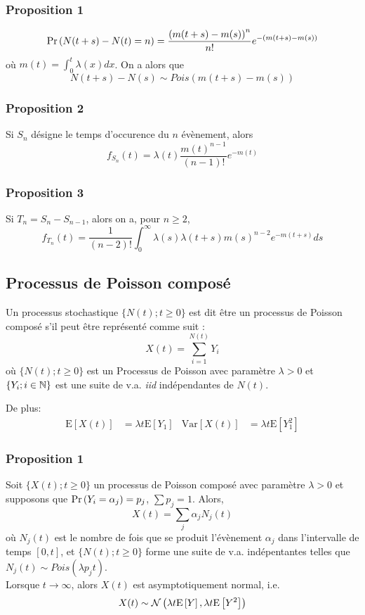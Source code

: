 \documentclass[10pt, french, landscape]{article}
\begin{document}
\begin{multicols*}{2}
\subsubsection*{Proposition 1}
\[\Pr \left( N(t+s) - N(t) = n \right)  = \frac{\left(m(t+s) - m(s) \right)^n}{n!} e^{-(m(t+s) - m(s))} \]
où $m(t) = \int_{0}^{t} \lambda(x) dx$. On a alors que
\[N(t+s) - N(s) \sim Pois(m(t+s) - m(s))\]


\subsubsection*{Proposition 2}
Si $S_n$ désigne le temps d'occurence du $n$ évènement, alors
\[f_{S_n}(t) = \lambda(t) \frac{m(t)^{n-1}}{(n-1)!} e^{-m(t)} \]

\subsubsection*{Proposition 3}
Si $T_n = S_{n} - S_{n-1}$, alors on a, pour $n \geq 2$,
\[f_{T_n}(t) = \frac{1}{(n-2)!} \int_{0}^{\infty} \lambda(s) \lambda(t+s) m(s)^{n-2} e^{-m(t+s)} ds \]

\subsection*{Processus de Poisson composé}
\begin{definition}[Définition]
Un processus stochastique $\{ N(t) ; t \geq 0  \}$ est dit être un processus de Poisson composé s'il peut être représenté comme suit : 
\[X(t) = \sum_{i=1}^{N(t)} Y_i\]
où $\{ N(t) ; t \geq 0  \}$ est un Processus de Poisson avec paramètre $\lambda > 0$ et $\{ Y_i ; i \in \mathbb{N} \}$ est une suite de v.a. \emph{iid} indépendantes de $N(t)$.

De plus:
\begin{align*}
	\text{E}[X(t)]	&=	\lambda t \text{E}[Y_1]	&
	\text{Var}[X(t)]	&=	\lambda t \text{E}[Y_1^{2}]
\end{align*}
\end{definition}

\subsubsection*{Proposition 1}
Soit $\{ X(t) ; t \geq 0 \}$ un processus de Poisson composé avec paramètre $\lambda > 0$ et supposons que $\Pr \left( Y_i = \alpha_j \right) = p_j$, $\sum p_j = 1$. Alors,
\[X(t) = \sum_j \alpha_j N_j(t) \]
où $N_j(t)$ est le nombre de fois que se produit l'évènement $\alpha_j$ dans l'intervalle de temps $[0,t]$, et $\{N(t) ; t \geq 0  \}$ forme une suite de v.a. indépentantes telles que $N_j(t) \sim Pois(\lambda p_j t)$. \\
Lorsque $t \to \infty$, alors $X(t)$ est asymptotiquement normal, i.e.
\[X(t) \sim \mathcal{N}\left( \lambda t \mathrm{E} \left[ Y \right], \lambda t \mathrm{E} \left[ Y^2 \right] \right)\]


\end{multicols*}
\end{document}
